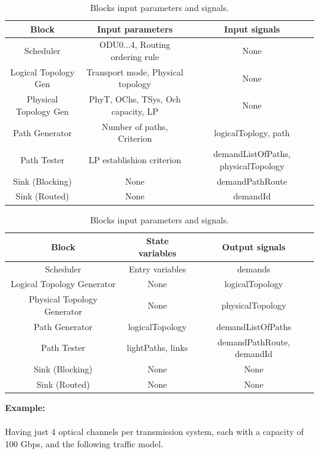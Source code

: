 \begin{table}[H]
	\centering
	\begin{tabular}{| c | c | c |}
		\hline
		Block & Input parameters & Input signals \\
		\hline
		Scheduler & ODU0...4, Routing ordering rule & None  \\ \hline
		Logical Topology Gen & Transport mode, Physical topology & None \\ \hline
		Physical Topology Gen & PhyT, OChs, TSys, Och capacity, LP & None \\ \hline
		Path Generator & Number of paths, Criterion &  logicalToplogy, path \\ \hline
		Path Tester & LP establishion criterion & demandListOfPaths, physicalTopology \\ \hline
		Sink (Blocking) & None & demandPathRoute \\ \hline
		Sink (Routed) & None & demandId 		\\ \hline
	\end{tabular}
	\caption{Blocks input parameters and signals.}
	\label{blocks_input}
\end{table}

\begin{table}[H]
	\centering
	\begin{tabular}{| c | c | c |}
		\hline
		Block & State variables & Output signals \\
		\hline
		Scheduler & Entry variables & demands  \\ \hline
		Logical Topology Generator & None & logicalTopology \\ \hline
		Physical Topology Generator & None & physicalTopology \\ \hline
		Path Generator & logicalTopology & demandListOfPaths  \\ \hline
		Path Tester & lightPaths, links & demandPathRoute, demandId \\ \hline
		Sink (Blocking) & None & None \\ \hline
		Sink (Routed) & None & None		\\ \hline
	\end{tabular}
	\caption{Blocks input parameters and signals.}
	\label{blocks_input}
\end{table}
\clearpage
\textbf{Example:}  \\
\\
Having just 4 optical channels per transmission system, each with a capacity of 100 Gbps, and the following traffic model.

